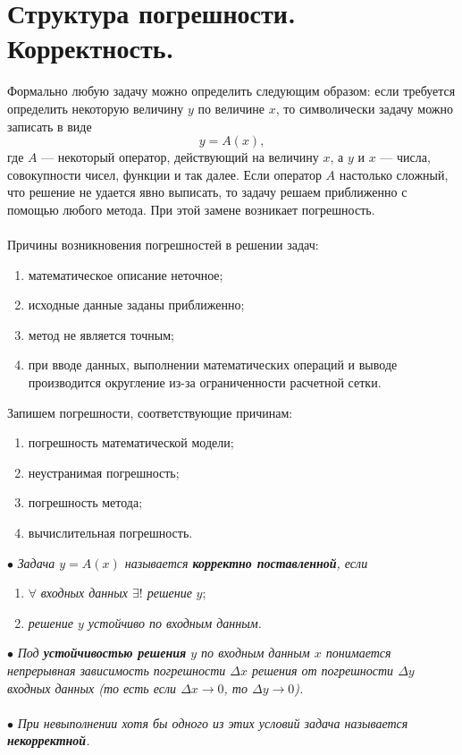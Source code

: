 \documentclass[a4paper, 12pt]{report}
\begin{document}
	\section{Структура погрешности. Корректность.}
	Формально любую задачу можно определить следующим образом: если требуется определить некоторую величину $y$ по величине $x$, то символически задачу можно записать в виде $$y = A(x),$$ где $A$ --- некоторый оператор, действующий на величину $x$, а $y$ и $x$ --- числа, совокупности чисел, функции и так далее. Если оператор $A$ настолько сложный, что решение не удается явно выписать, то задачу решаем приближенно с помощью любого метода. При этой замене возникает погрешность.\\\\
	Причины возникновения погрешностей в решении задач:
	\begin{enumerate}
		\item математическое описание неточное;
		\item исходные данные заданы приближенно;
		\item метод не является точным;
		\item при вводе данных, выполнении математических операций и выводе производится округление из-за ограниченности расчетной сетки.
	\end{enumerate}
	Запишем погрешности, соответствующие причинам:
	\begin{enumerate}
		\item погрешность математической модели;
		\item неустранимая погрешность;
		\item погрешность метода;
		\item вычислительная погрешность.
	\end{enumerate}
	$\bullet$ \textit{Задача $y = A(x)$ называется \textbf{корректно поставленной}, если} \begin{enumerate}
		\item $\forall$ \textit{входных данных $\exists !$ решение} $y$;
		\item \textit{решение $y$ устойчиво по входным данным.}
	\end{enumerate}
	$\bullet$ \textit{Под \textbf{устойчивостью решения} $y$ по входным данным $x$ понимается непрерывная зависимость погрешности $\Delta x$ решения от погрешности $\Delta y$ входных данных (то есть если $\Delta x \to 0$, то $\Delta y \to 0$).}\\\\
	$\bullet$ \textit{При невыполнении хотя бы одного из этих условий задача называется \textbf{некорректной}.}
\end{document}
